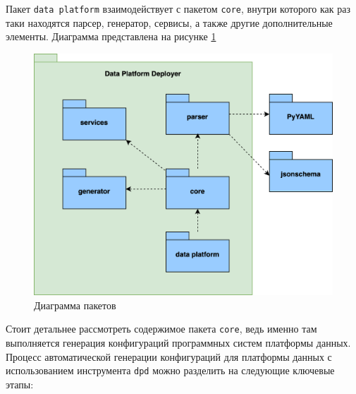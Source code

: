 Пакет \texttt{data platform} взаимодействует с пакетом \texttt{core}, внутри которого как раз таки находятся парсер, генератор, сервисы, а также другие дополнительные элементы.
Диаграмма представлена на рисунке \ref{fig:diagram_package}

\begin{figure}
      \center
      \includegraphics [scale=0.4] {my_folder/images/diagram_package}
      \caption{Диаграмма пакетов}
      \label{fig:diagram_package}
\end{figure}
\FloatBarrier
Стоит детальнее рассмотреть содержимое пакета \texttt{core}, ведь именно там выполняется генерация конфигураций программных систем платформы данных.
Процесс автоматической генерации конфигураций для платформы данных с использованием инструмента \texttt{dpd} можно разделить на следующие ключевые этапы:
